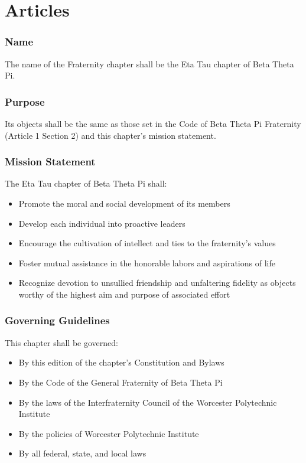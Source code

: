 \part{Articles}


\section{Name}

The name of the Fraternity chapter shall be the Eta Tau chapter of Beta Theta Pi.

\section{Purpose}

Its objects shall be the same as those set in the Code of Beta Theta Pi Fraternity (Article 1 Section 2) and this chapter’s mission statement.

\section{Mission Statement}

The Eta Tau chapter of Beta Theta Pi shall:
\begin{itemize}
        \item Promote the moral and social development of its members
        \item Develop each individual into proactive leaders
        \item Encourage the cultivation of intellect and ties to the fraternity’s values
        \item Foster mutual assistance in the honorable labors and aspirations of life
        \item Recognize devotion to unsullied friendship and unfaltering fidelity as objects worthy of the highest aim and purpose of associated effort
\end{itemize}

\section{Governing Guidelines}
This chapter shall be governed:
\begin{itemize}
        \item By this edition of the chapter’s Constitution and Bylaws
        \item By the Code of the General Fraternity of Beta Theta Pi
        \item By the laws of the Interfraternity Council of the Worcester Polytechnic Institute
        \item By the policies of Worcester Polytechnic Institute
        \item By all federal, state, and local laws
\end{itemize}

